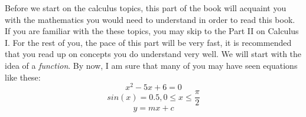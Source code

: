 \quad \quad Before we start on the calculus topics, this part of the book will acquaint you with the mathematics you would need to understand in order to read this book. If you are familiar with the these topics, you may skip to the Part II on Calculus I. For the rest of you, the pace of this part will be very fast, it is recommended that you read up on concepts you do understand very well. We will start with the idea of a \textit{function}. By now, I am sure that many of you may have seen equations like these:
  \begin{equation}
    x^2-5x+6=0
  \end{equation}
  \begin{equation}
    sin(x)=0.5, 0\leq x \leq\frac{\pi}{2}
  \end{equation}
  \begin{equation}
    \label{line}
    y=mx+c
  \end{equation}
  \begin{marginfigure}
    \tiny\caption{Graph of $$y=x$$.}
  \end{marginfigure}

